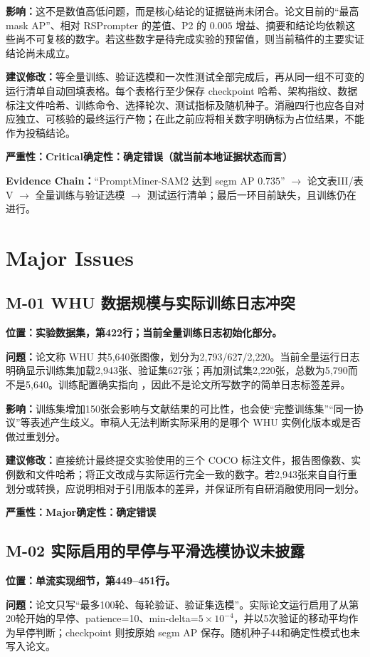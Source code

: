 \documentclass[UTF8,a4paper,11pt]{ctexart}
\newcommand{\sev}[1]{\textbf{严重性：#1}}
\newcommand{\cert}[1]{\textbf{确定性：#1}}
\newcommand{\loc}[1]{\textbf{位置：#1}}
\newcommand{\prob}{\textbf{问题：}}
\newcommand{\impact}{\textbf{影响：}}
\newcommand{\fix}{\textbf{建议修改：}}
\begin{document}
\impact 这不是数值高低问题，而是核心结论的证据链尚未闭合。论文目前的“最高 mask AP”、相对 RSPrompter 的差值、P2 的 $0.005$ 增益、摘要和结论均依赖这些尚不可复核的数字。若这些数字是待完成实验的预留值，则当前稿件的主要实证结论尚未成立。

\fix 等全量训练、验证选模和一次性测试全部完成后，再从同一组不可变的运行清单自动回填表格。每个表格行至少保存 checkpoint 哈希、架构指纹、数据标注文件哈希、训练命令、选择轮次、测试指标及随机种子。消融四行也应各自对应独立、可核验的最终运行产物；在此之前应将相关数字明确标为占位结果，不能作为投稿结论。

\sev{Critical}\quad \cert{确定错误（就当前本地证据状态而言）}

\textbf{Evidence Chain：}“PromptMiner-SAM2 达到 segm AP $0.735$” $\rightarrow$ 论文表III/表V $\rightarrow$ 全量训练与验证选模 $\rightarrow$ 测试运行清单；最后一环目前缺失，且训练仍在进行。

\section*{Major Issues}

\subsection*{M-01 WHU 数据规模与实际训练日志冲突}
\loc{实验数据集，第422行；当前全量训练日志初始化部分。}

\prob 论文称 WHU 共5,640张图像，划分为2,793/627/2,220。当前全量运行日志明确显示训练集加载2,943张、验证集627张；再加测试集2,220张，总数为5,790而不是5,640。训练配置确实指向 ，因此不是论文所写数字的简单日志标签差异。

\impact 训练集增加150张会影响与文献结果的可比性，也会使“完整训练集”“同一协议”等表述产生歧义。审稿人无法判断实际采用的是哪个 WHU 实例化版本或是否做过重划分。

\fix 直接统计最终提交实验使用的三个 COCO 标注文件，报告图像数、实例数和文件哈希；将正文改成与实际运行完全一致的数字。若2,943张来自自行重划分或转换，应说明相对于引用版本的差异，并保证所有自研消融使用同一划分。

\sev{Major}\quad \cert{确定错误}

\subsection*{M-02 实际启用的早停与平滑选模协议未披露}
\loc{单流实现细节，第449--451行。}

\prob 论文只写“最多100轮、每轮验证、验证集选模”。实际论文运行启用了从第20轮开始的早停、patience=10、min-delta=$5\times10^{-4}$，并以5次验证的移动平均作为早停判断；checkpoint 则按原始 segm AP 保存。随机种子44和确定性模式也未写入论文。
\end{document}
